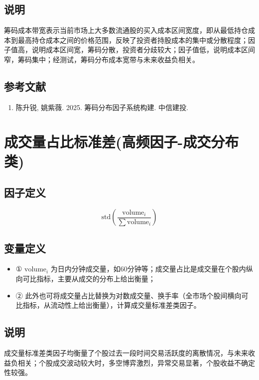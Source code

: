 \documentclass{article}
\begin{document}
\subsection{说明}
筹码成本带宽表示当前市场上大多数流通股的买入成本区间宽度，即从最低持仓成本到最高持仓成本之间的价格范围，反映了投资者持股成本的集中或分散程度；因子值高，说明成本区间宽，筹码分散，投资者分歧较大；因子值低，说明成本区间窄，筹码集中；经测试，筹码分布成本宽带与未来收益负相关。

\subsection{参考文献}
\begin{enumerate}
    \item 陈升锐, 姚紫薇. 2025. 筹码分布因子系统构建. 中信建投.
\end{enumerate}

\section{成交量占比标准差(高频因子-成交分布类)}

\subsection{因子定义}
\begin{equation}
    \mathrm{std}\left(\frac{\mathrm{volume}_i}{\sum \mathrm{volume}_i}\right)
\end{equation}

\subsection{变量定义}
\begin{itemize}
    \item ① \( \mathrm{volume}_i \) 为日内分钟成交量，如60分钟等；成交量占比是成交量在个股内纵向可比指标，主要从成交的分布上给出衡量；
    \item ② 此外也可将成交量占比替换为对数成交量、换手率（全市场个股间横向可比指标，从流动性上给出衡量），计算成交量标准差类因子。
\end{itemize}

\subsection{说明}
成交量标准差类因子均衡量了个股过去一段时间交易活跃度的离散情况，与未来收益负相关；个股成交波动较大时，多空博弈激烈，异常交易显著，个股收益不确定性较强。
\end{document}
